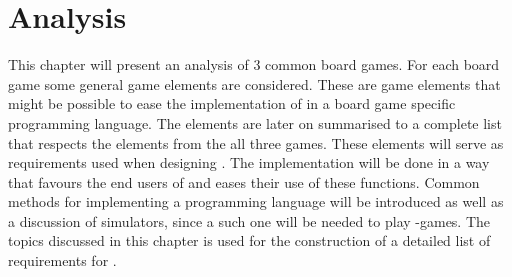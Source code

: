 \chapter{Analysis}
This chapter will present an analysis of 3 common board games. For each board game some general game elements are considered. These are game elements that might be possible to ease the implementation of in a board game specific programming language. The elements are later on summarised to a complete list that respects the elements from the all three games. These elements will serve as requirements used when designing \productname{}. The implementation will be done in a way that favours the end users of \productname{} and eases their use of these functions. Common methods for implementing a programming language will be introduced as well as a discussion of simulators, since a such one will be needed to play \productname{}-games. The topics discussed in this chapter is used for the construction of a detailed list of requirements for \productname{}.









%




